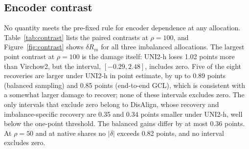 \subsection{Encoder contrast}
No quantity meets the pre-fixed rule for encoder dependence at any allocation. Table~\ref{tab:contrast} lists the paired contrasts at $\rho=100$, and Figure~\ref{fig:contrast} shows $\delta R_m$ for all three imbalanced allocations. The largest point contrast at $\rho=100$ is the damage itself: UNI2-h loses 1.02 points more than Virchow2, but the interval, $[-0.29, 2.48]$, includes zero. Five of the eight recoveries are larger under UNI2-h in point estimate, by up to 0.89 points (balanced sampling) and 0.85 points (end-to-end GCL), which is consistent with a somewhat larger damage to recover; none of these intervals excludes zero. The only intervals that exclude zero belong to DisAlign, whose recovery and imbalance-specific recovery are 0.35 and 0.34 points smaller under UNI2-h, well below the one-point threshold. The balanced gains differ by at most 0.36 points. At $\rho=50$ and at native shares no $|\delta|$ exceeds 0.82 points, and no interval excludes zero.

